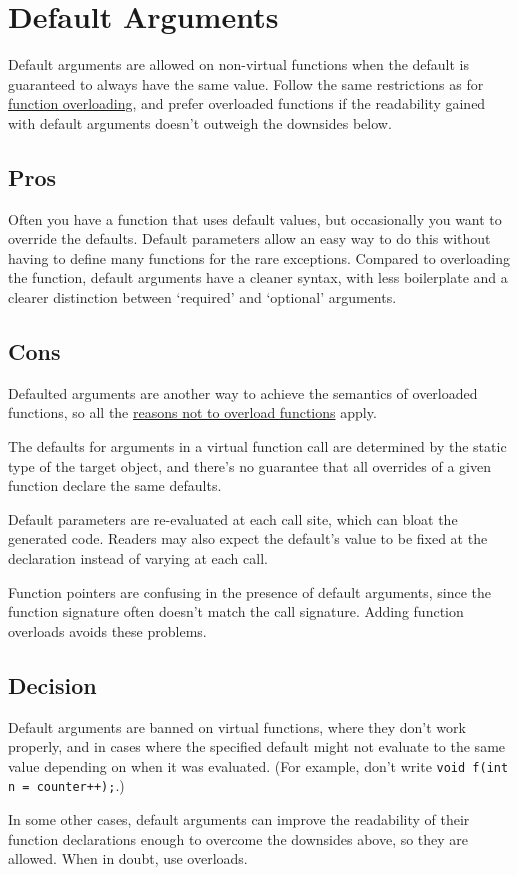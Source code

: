 
\section{Default Arguments}\label{sec:default-arguments}
Default arguments are allowed on non-virtual functions when the default is guaranteed to always have the same value. Follow the same restrictions as for \hyperref[sec:function-overloading]{function overloading}, and prefer overloaded functions if the readability gained with default arguments doesn't outweigh the downsides below.

\subsection{Pros}
Often you have a function that uses default values, but occasionally you want to override the defaults. Default parameters allow an easy way to do this without having to define many functions for the rare exceptions. Compared to overloading the function, default arguments have a cleaner syntax, with less boilerplate and a clearer distinction between \enquote*{required} and \enquote*{optional} arguments.

\subsection{Cons}
Defaulted arguments are another way to achieve the semantics of overloaded functions, so all the \hyperref[sec:function-overloading]{reasons not to overload functions} apply.

The defaults for arguments in a virtual function call are determined by the static type of the target object, and there's no guarantee that all overrides of a given function declare the same defaults.

Default parameters are re-evaluated at each call site, which can bloat the generated code. Readers may also expect the default's value to be fixed at the declaration instead of varying at each call.

Function pointers are confusing in the presence of default arguments, since the function signature often doesn't match the call signature. Adding function overloads avoids these problems.

\subsection{Decision}
Default arguments are banned on virtual functions, where they don't work properly, and in cases where the specified default might not evaluate to the same value depending on when it was evaluated. (For example, don't write \texttt{void f(int n = counter++);}.)

In some other cases, default arguments can improve the readability of their function declarations enough to overcome the downsides above, so they are allowed. When in doubt, use overloads.
